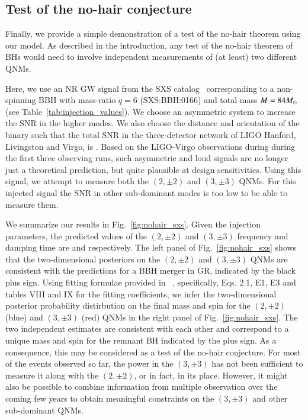 \subsection{Test of the no-hair conjecture}\label{ssec:nohairtheorem}

Finally, we provide a simple demonstration of a test of the no-hair
theorem using our model. As described in the introduction, any test of
the no-hair theorem of BHs would need to involve independent
measurements of (at least) two different QNMs.

Here, we use an NR GW signal from the SXS catalog~\cite{Mroue:2013xna}
corresponding to a non-spinning BBH with mass-ratio $q=6$ (SXS:BBH:0166) and 
total mass $M=84 M_{\odot}$ (see Table~\ref{tab:injection_values}).
We choose an asymmetric system to increase the SNR in the higher modes.
We also choose the distance and orientation of the binary
such that the total SNR in the three-detector network of LIGO Hanford, Livingston and
Virgo, is . Based on the LIGO-Virgo observations during during the first three observing runs, 
such asymmetric and loud signals are no longer just a theoretical
prediction, but quite plausible at design sensitivities. Using this
signal, we attempt to measure both the $(2,\pm 2)$ and
$(3,\pm 3)$ QNMs. For this injected signal the SNR in
other sub-dominant modes is too low to be able to measure them.

We summarize our results in Fig.~\ref{fig:nohair_sxs}.  Given the injection parameters, the predicted values of the $(2,\pm 2)$ and $(3,\pm 3)$ frequency and damping time are   and  respectively. The left panel of Fig.~\ref{fig:nohair_sxs} shows that the two-dimensional posteriors on the $(2,\pm 2)$ and $(3,\pm 3)$ QNMs are consistent with the predictions for a BBH merger in GR, indicated by the black plus sign.  Using fitting formulae provided in ~\cite{Berti:2005ys}, specifically,  Eqs. 2.1, E1, E3 and tables VIII and IX for the fitting coefficients, we infer the two-dimensional posterior probability distirbution on the final mass and spin for the $(2,\pm 2)$ (blue) and $(3,\pm 3)$ (red) QNMs in the right panel of Fig.~\ref{fig:nohair_sxs}. The two independent estimates are consistent with each other and correspond to a unique mass and spin for the remnant BH  indicated by the plus sign. As a consequence, this may be considered as a test of the no-hair conjecture. For most of the events observed so far, the power in the $(3,\pm 3)$ has not been sufficient to measure it along with the $(2,\pm 2)$, or in fact, in its place. However, it might also be possible to combine information from multiple observation over the coming few years to obtain meaningful constraints on the $(3,\pm 3)$ and
other sub-dominant QNMs.

